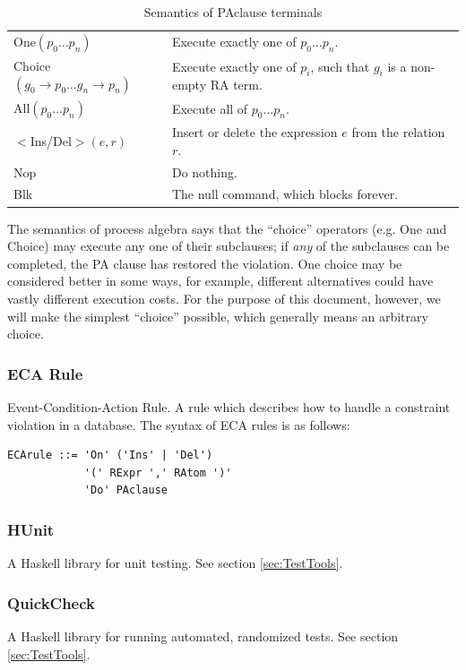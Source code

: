 \documentclass[12pt]{report}
\begin{document}
\begin{table}[ht!]\begin{center}\label{tab:PASemantics}
\caption{Semantics of PAclause terminals}
\begin{tabularx}{\textwidth}{lX}
One$(p_0 \ldots p_n)$ & Execute exactly one of $p_0 \ldots p_n$. \\
Choice$(g_0 \rightarrow p_0 \ldots g_n \rightarrow p_n)$ & Execute exactly
  one of $p_i$, such that $g_i$ is a non-empty RA term. \\
All$(p_0 \ldots p_n)$ & Execute all of $p_0 \ldots p_n$. \\
$<$Ins/Del$>(e,r)$ & Insert or delete the expression $e$ from the relation $r$. \\
Nop & Do nothing. \\
Blk & The null command, which blocks forever. 
\end{tabularx}
\end{center}\end{table}

The semantics of process algebra says that the ``choice'' operators (e.g. One
and Choice) may execute any one of their subclauses; if \emph{any} of the
subclauses can be completed, the PA clause has restored the violation.  One
choice may be considered better in some ways, for example, different
alternatives could have vastly different execution costs. For the purpose of
this document, however, we will make the simplest ``choice'' possible, which
generally means an arbitrary choice. 

\subsubsection*{ECA Rule}
 Event-Condition-Action Rule. A rule which describes how to handle a constraint
 violation in a database. The syntax of ECA rules is as follows:

\begin{lstlisting}[basicstyle=\ttfamily]
ECArule ::= 'On' ('Ins' | 'Del') 
            '(' RExpr ',' RAtom ')'
            'Do' PAclause    
\end{lstlisting}

\subsubsection*{HUnit}
 A Haskell library for unit testing. See section \ref{sec:TestTools}.
\subsubsection*{QuickCheck}
 A Haskell library for running automated, randomized tests. See section 
 \ref{sec:TestTools}.
 
\end{document}
